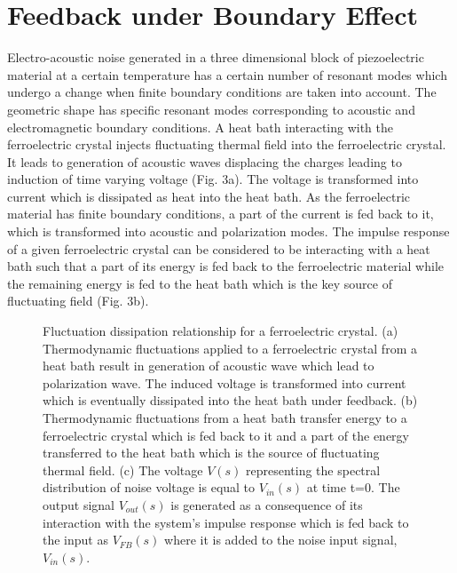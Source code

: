 \documentclass[12pt,column,showpacs,pre,preprintnumbers,amsmath,amssymb,aps,standalone]{revtex4-2}
\begin{document}
\section{Feedback under Boundary Effect}
Electro-acoustic noise generated in a three dimensional block of piezoelectric material at a certain temperature has a certain number of resonant modes which undergo a change when finite boundary conditions are taken into account. The geometric shape has specific resonant modes corresponding to acoustic and electromagnetic boundary conditions. A heat bath interacting with the ferroelectric crystal injects fluctuating thermal field into the ferroelectric crystal. It leads to generation of acoustic waves displacing the charges leading to induction of time varying voltage (Fig. 3a). The voltage is transformed into current which is dissipated as heat into the heat bath. As the ferroelectric material has finite boundary conditions, a part of the current is fed back to it, which is transformed into acoustic and polarization modes. The impulse response of a given ferroelectric crystal can be considered to be interacting with a heat bath such that a part of its energy is fed back to the ferroelectric material while the remaining energy is fed to the heat bath which is the key source of fluctuating field (Fig. 3b).
\begin{figure}[htbp]
	  
	\label{Fig. 3}
	\caption{\small Fluctuation dissipation relationship for a ferroelectric crystal. (a) Thermodynamic fluctuations applied to a ferroelectric crystal from a heat bath result in generation of acoustic wave which lead to polarization wave. The induced voltage is transformed into current which is eventually dissipated into the heat bath under feedback. (b) Thermodynamic fluctuations from a heat bath transfer energy to a ferroelectric crystal which is fed back to it and a part of the energy transferred to the heat bath which is the source of fluctuating thermal field. (c) The voltage $V(s)$ representing the spectral distribution of noise voltage is equal to $V_{in}(s)$ at time {t=0}. The output signal $V_{out}(s)$ is generated as a consequence of its interaction with the system's impulse response which is fed back to the input as $V_{FB}(s)$ where it is added to the noise input signal, $V_{in}(s)$. }
\end{figure}
\end{document}
